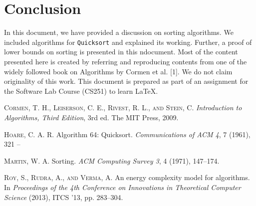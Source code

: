 \documentclass[a4paper, 10pt,twocolumn]{article}
\begin{document}
\section{Conclusion}
In this document, we have provided a discussion on sorting algorithms. We included algorithms for \texttt{Quicksort} and explained its working. Further, a proof of lower bounds on sorting is presented in this ndocument. Most of the content presented here is created by referring and reproducing contents from one of the widely followed book on Algorithms by Cormen et al. [1]. We do not claim originality of this work. This document is prepared as part of an assignment for the Software Lab Course (CS251) to learn \LaTeX.
\begin{thebibliography}{25}
\textsc{Cormen}, \textsc{T. H.}, \textsc{Leiserson}, \textsc{C. E., Rivest, R. L.}, \textsc{and Stein, C}. \textit{Introduction to Algorithms, Third Edition}, 3rd ed. The MIT Press, 2009.

\textsc{Hoare, C. A. R.} Algorithm 64: Quicksort. \textit{Communications of ACM 4}, 7 (1961), 321 --


\textsc{Martin, W. A.} Sorting. \textit{ACM Computing Survey 3}, 4 (1971), 147--174.


\textsc{Roy, S., Rudra, A., and Verma, A.} An energy complexity model for algorithms. In \textit{Proceedings of the 4th Conference on Innovations in Theoretical Computer Science} (2013), ITCS '13, pp. 283--304.

\end{thebibliography}
\end{document}
